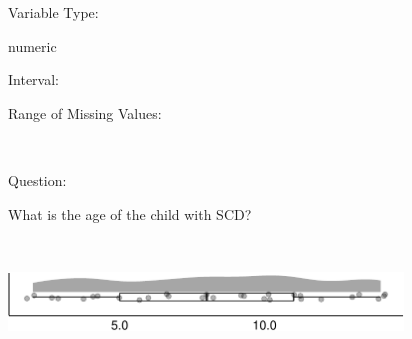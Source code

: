 \documentclass[
]{article}
\begin{document}
\begin{minipage}[t]{0.3\linewidth}

Variable Type:

\end{minipage}%
\begin{minipage}[t]{0.7\linewidth}

numeric

\end{minipage}

\begin{minipage}[t]{0.3\linewidth}

Interval:

\end{minipage}%
\begin{minipage}[t]{0.7\linewidth}

\end{minipage}

\begin{minipage}[t]{0.3\linewidth}

Range of Missing Values:

\end{minipage}%
\begin{minipage}[t]{0.7\linewidth}

~

\end{minipage}

\begin{minipage}[t]{0.3\linewidth}

Question:

\end{minipage}%
\begin{minipage}[t]{0.7\linewidth}

What is the age of the child with SCD?

\end{minipage}

\begin{minipage}[t]{0.3\linewidth}

~

\end{minipage}%
\begin{minipage}[t]{0.7\linewidth}

\includegraphics[width=396px]{codebook_template_files/figure-latex/q14_rainplot-1}

\end{minipage}
 \vspace*{0.5mm} 
\end{document}
